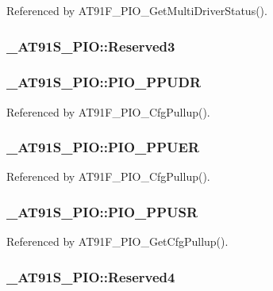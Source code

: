 Referenced by AT91F\_\-PIO\_\-GetMultiDriverStatus().\hypertarget{struct__AT91S__PIO_d2620a66d1ff140dabc2d6ea26c837a9}{
\subsubsection{ {\bf \_\-AT91S\_\-PIO::Reserved3}}}
\label{struct__AT91S__PIO_d2620a66d1ff140dabc2d6ea26c837a9}


\hypertarget{struct__AT91S__PIO_13486a9a19a3b6bea5e1b48eddb00e66}{
\subsubsection{ {\bf \_\-AT91S\_\-PIO::PIO\_\-PPUDR}}}
\label{struct__AT91S__PIO_13486a9a19a3b6bea5e1b48eddb00e66}




Referenced by AT91F\_\-PIO\_\-CfgPullup().\hypertarget{struct__AT91S__PIO_79beafff21463b90ed761353a33e6b32}{
\subsubsection{ {\bf \_\-AT91S\_\-PIO::PIO\_\-PPUER}}}
\label{struct__AT91S__PIO_79beafff21463b90ed761353a33e6b32}




Referenced by AT91F\_\-PIO\_\-CfgPullup().\hypertarget{struct__AT91S__PIO_69c2f363f47de55fe0e8c63ab24e323c}{
\subsubsection{ {\bf \_\-AT91S\_\-PIO::PIO\_\-PPUSR}}}
\label{struct__AT91S__PIO_69c2f363f47de55fe0e8c63ab24e323c}




Referenced by AT91F\_\-PIO\_\-GetCfgPullup().\hypertarget{struct__AT91S__PIO_826b47fcd00f5cc0e24e4dd1d945ee62}{
\subsubsection{ {\bf \_\-AT91S\_\-PIO::Reserved4}}}
\label{struct__AT91S__PIO_826b47fcd00f5cc0e24e4dd1d945ee62}


